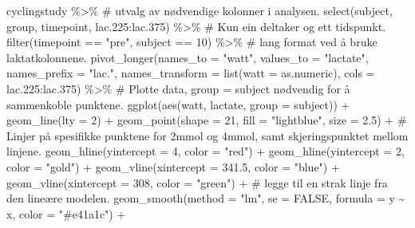 \documentclass[
  letterpaper,
  DIV=11,
  numbers=noendperiod]{scrartcl}
\newenvironment{Shaded}{\begin{snugshade}}{\end{snugshade}}
\newcommand{\AttributeTok}[1]{\textcolor[rgb]{0.40,0.45,0.13}{#1}}
\newcommand{\CommentTok}[1]{\textcolor[rgb]{0.37,0.37,0.37}{#1}}
\newcommand{\ConstantTok}[1]{\textcolor[rgb]{0.56,0.35,0.01}{#1}}
\newcommand{\DecValTok}[1]{\textcolor[rgb]{0.68,0.00,0.00}{#1}}
\newcommand{\FloatTok}[1]{\textcolor[rgb]{0.68,0.00,0.00}{#1}}
\newcommand{\FunctionTok}[1]{\textcolor[rgb]{0.28,0.35,0.67}{#1}}
\newcommand{\NormalTok}[1]{\textcolor[rgb]{0.00,0.23,0.31}{#1}}
\newcommand{\SpecialCharTok}[1]{\textcolor[rgb]{0.37,0.37,0.37}{#1}}
\newcommand{\StringTok}[1]{\textcolor[rgb]{0.13,0.47,0.30}{#1}}
\begin{document}
\begin{Shaded}
\begin{Highlighting}[]
\NormalTok{cyclingstudy }\SpecialCharTok{\%\textgreater{}\%}
  \CommentTok{\# utvalg av nødvendige kolonner i analysen.}
  \FunctionTok{select}\NormalTok{(subject, group, timepoint, lac}\FloatTok{.225}\SpecialCharTok{:}\NormalTok{lac}\FloatTok{.375}\NormalTok{) }\SpecialCharTok{\%\textgreater{}\%}
  \CommentTok{\# Kun ein deltaker og ett tidspunkt.}
  \FunctionTok{filter}\NormalTok{(timepoint }\SpecialCharTok{==} \StringTok{"pre"}\NormalTok{, subject }\SpecialCharTok{==} \DecValTok{10}\NormalTok{) }\SpecialCharTok{\%\textgreater{}\%}
  \CommentTok{\# lang format ved å bruke laktatkolonnene.}
  \FunctionTok{pivot\_longer}\NormalTok{(}\AttributeTok{names\_to =} \StringTok{"watt"}\NormalTok{,}
               \AttributeTok{values\_to =} \StringTok{"lactate"}\NormalTok{,}
               \AttributeTok{names\_prefix =} \StringTok{"lac."}\NormalTok{,}
               \AttributeTok{names\_transform =} \FunctionTok{list}\NormalTok{(}\AttributeTok{watt =}\NormalTok{ as.numeric),}
               \AttributeTok{cols =}\NormalTok{ lac}\FloatTok{.225}\SpecialCharTok{:}\NormalTok{lac}\FloatTok{.375}\NormalTok{) }\SpecialCharTok{\%\textgreater{}\%}
  \CommentTok{\# Plotte data, group = subject nødvendig for å sammenkoble punktene.}
  \FunctionTok{ggplot}\NormalTok{(}\FunctionTok{aes}\NormalTok{(watt, lactate, }\AttributeTok{group =}\NormalTok{ subject)) }\SpecialCharTok{+}
  \FunctionTok{geom\_line}\NormalTok{(}\AttributeTok{lty =} \DecValTok{2}\NormalTok{) }\SpecialCharTok{+}
  \FunctionTok{geom\_point}\NormalTok{(}\AttributeTok{shape =} \DecValTok{21}\NormalTok{, }\AttributeTok{fill =} \StringTok{"lightblue"}\NormalTok{, }\AttributeTok{size =} \FloatTok{2.5}\NormalTok{) }\SpecialCharTok{+}
  \CommentTok{\# Linjer på spesifikke punktene for 2mmol og 4mmol, samt skjeringspunktet mellom linjene.}
  \FunctionTok{geom\_hline}\NormalTok{(}\AttributeTok{yintercept =} \DecValTok{4}\NormalTok{, }\AttributeTok{color =} \StringTok{"red"}\NormalTok{) }\SpecialCharTok{+}
  \FunctionTok{geom\_hline}\NormalTok{(}\AttributeTok{yintercept =} \DecValTok{2}\NormalTok{, }\AttributeTok{color =} \StringTok{"gold"}\NormalTok{) }\SpecialCharTok{+}
  \FunctionTok{geom\_vline}\NormalTok{(}\AttributeTok{xintercept =} \FloatTok{341.5}\NormalTok{, }\AttributeTok{color =} \StringTok{"blue"}\NormalTok{) }\SpecialCharTok{+}
  \FunctionTok{geom\_vline}\NormalTok{(}\AttributeTok{xintercept =} \DecValTok{308}\NormalTok{, }\AttributeTok{color =} \StringTok{"green"}\NormalTok{) }\SpecialCharTok{+}
  \CommentTok{\# legge til en strak linje fra den lineære modelen.}
  \FunctionTok{geom\_smooth}\NormalTok{(}\AttributeTok{method =} \StringTok{"lm"}\NormalTok{, }\AttributeTok{se =} \ConstantTok{FALSE}\NormalTok{, }\AttributeTok{formula =}\NormalTok{ y }\SpecialCharTok{\textasciitilde{}}\NormalTok{ x, }\AttributeTok{color =} \StringTok{"\#e41a1c"}\NormalTok{) }\SpecialCharTok{+}
  

\end{Highlighting}
\end{Shaded}
\end{document}
